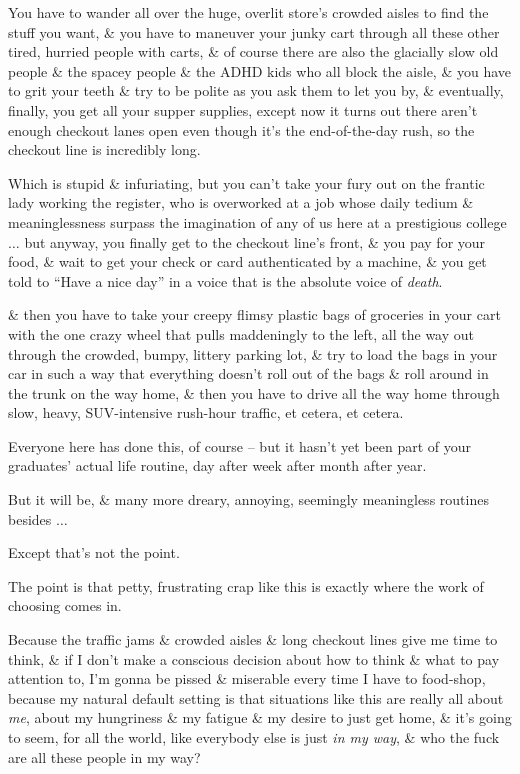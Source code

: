 \documentclass{article}
\begin{document}
You have to wander all over the huge, overlit store's crowded aisles to find the stuff you want, \& you have to maneuver your junky cart through all these other tired, hurried people with carts, \& of course there are also the glacially slow old people \& the spacey people \& the ADHD kids who all block the aisle, \& you have to grit your teeth \& try to be polite as you ask them to let you by, \& eventually, finally, you get all your supper supplies, except now it turns out there aren't enough checkout lanes open even though it's the end-of-the-day rush, so the checkout line is incredibly long.

Which is stupid \& infuriating, but you can't take your fury out on the frantic lady working the register, who is overworked at a job whose daily tedium \& meaninglessness surpass the imagination of any of us here at a prestigious college $\ldots$ but anyway, you finally get to the checkout line's front, \& you pay for your food, \& wait to get your check or card authenticated by a machine, \& you get told to ``Have a nice day'' in a voice that is the absolute voice of {\it death}.

\& then you have to take your creepy flimsy plastic bags of groceries in your cart with the one crazy wheel that pulls maddeningly to the left, all the way out through the crowded, bumpy, littery parking lot, \& try to load the bags in your car in such a way that everything doesn't roll out of the bags \& roll around in the trunk on the way home, \& then you have to drive all the way home through slow, heavy, SUV-intensive rush-hour traffic, et cetera, et cetera.

Everyone here has done this, of course -- but it hasn't yet been part of your graduates' actual life routine, day after week after month after year.

But it will be, \& many more dreary, annoying, seemingly meaningless routines besides $\ldots$

Except that's not the point.

The point is that petty, frustrating crap like this is exactly where the work of choosing comes in.

Because the traffic jams \& crowded aisles \& long checkout lines give me time to think, \& if I don't make a conscious decision about how to think \& what to pay attention to, I'm gonna be pissed \& miserable every time I have to food-shop, because my natural default setting is that situations like this are really all about {\it me}, about my hungriness \& my fatigue \& my desire to just get home, \& it's going to seem, for all the world, like everybody else is just {\it in my way}, \& who the fuck are all these people in my way?
\end{document}
